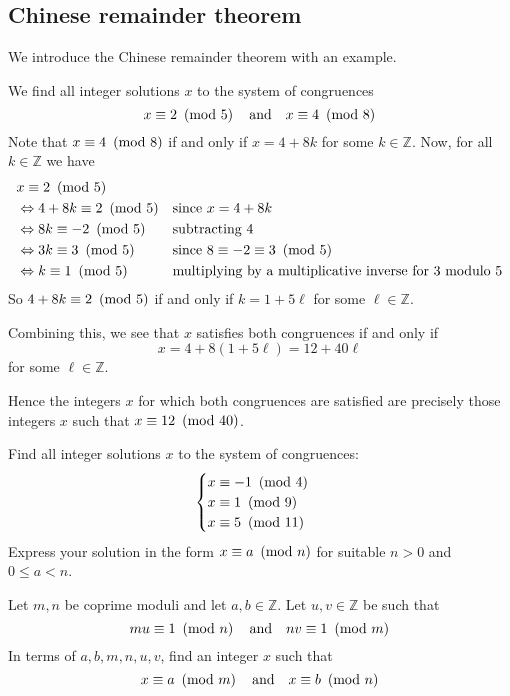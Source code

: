 \subsection*{Chinese remainder theorem}

We introduce the Chinese remainder theorem with an example.

\begin{example}
We find all integer solutions $x$ to the system of congruences
\[ x \equiv 2 ~\left(\text{mod}~5\right) \quad \text{and} \quad x \equiv 4 ~\left(\text{mod}~8\right) \]
Note that $x \equiv 4 ~\left(\text{mod}~8\right)$ if and only if $x = 4+8k$ for some $k \in \mathbb{Z}$. Now, for all $k \in \mathbb{Z}$ we have
\begin{align*}
&x \equiv 2 ~\left(\text{mod}~5\right) && \\
&\Leftrightarrow 4+8k \equiv 2 ~\left(\text{mod}~5\right) && \text{since } x=4+8k \\
&\Leftrightarrow 8k \equiv -2 ~\left(\text{mod}~5\right) && \text{subtracting $4$} \\
&\Leftrightarrow 3k \equiv 3 ~\left(\text{mod}~5\right) && \text{since $8 \equiv -2 \equiv 3 ~\left(\text{mod}~5\right)$} \\
&\Leftrightarrow k \equiv 1 ~\left(\text{mod}~5\right) && \text{multiplying by a multiplicative inverse for $3$ modulo $5$}
\end{align*}
So $4+8k \equiv 2 ~\left(\text{mod}~5\right)$ if and only if $k = 1 + 5\ell$ for some $\ell \in \mathbb{Z}$.

Combining this, we see that $x$ satisfies both congruences if and only if
\[ x = 4+8(1+5\ell) = 12+40\ell \]
for some $\ell \in \mathbb{Z}$.

Hence the integers $x$ for which both congruences are satisfied are precisely those integers $x$ such that $x \equiv 12 ~\left(\text{mod}~40\right)$.
\end{example}

\begin{exercise}
Find all integer solutions $x$ to the system of congruences:
\[ \begin{cases}
x \equiv {-1} ~\left(\text{mod}~4\right) \\
x \equiv 1 ~\left(\text{mod}~9\right) \\
x \equiv 5 ~\left(\text{mod}~11\right)
\end{cases} \]
Express your solution in the form $x \equiv a ~\left(\text{mod}~n\right)$ for suitable $n > 0$ and $0 \le a < n$.
\end{exercise}

\begin{exercise}
\label{exCRTExistence}
Let $m,n$ be coprime moduli and let $a,b \in \mathbb{Z}$. Let $u,v \in \mathbb{Z}$ be such that
\[ mu \equiv 1 ~\left(\text{mod}~n\right) \quad \text{and} \quad nv \equiv 1 ~\left(\text{mod}~m\right) \]
In terms of $a,b,m,n,u,v$, find an integer $x$ such that
\[ x \equiv a ~\left(\text{mod}~m\right) \quad \text{and} \quad x \equiv b ~\left(\text{mod}~n\right) \]
\end{exercise}

